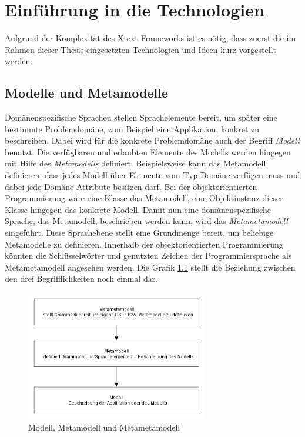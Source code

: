 \documentclass[a4paper,12pt]{scrreprt}
\begin{document}
\chapter{Einführung in die Technologien}
\label{ch:technologien}
Aufgrund der Komplexität des Xtext-Frameworks ist es nötig, dass zuerst die im Rahmen dieser Thesis eingesetzten Technologien und Ideen kurz vorgestellt werden.
\section{Modelle und  Metamodelle}
Domänenspezifische Sprachen stellen Sprachelemente bereit, um später eine be\-stimm\-te Problemdomäne, zum Beispiel eine Applikation, konkret zu beschreiben.
Dabei wird für die konkrete Problemdomäne auch der Begriff \textit{Modell} benutzt.
Die verfügbaren und erlaubten Elemente des Modells werden hingegen mit Hilfe des \textit{Metamodells} definiert. Beispielsweise kann das Metamodell definieren, dass jedes Modell über Elemente vom Typ Domäne verfügen muss und dabei jede Domäne Attribute besitzen darf. Bei der objektorientierten Programmierung wäre eine Klasse das  Metamodell, eine Objektinstanz dieser Klasse hingegen das konkrete Modell.
Damit nun eine domänenspezifische Sprache, das  Metamodell, beschrieben werden kann, wird das \textit{Metametamodell} eingeführt. Diese Sprachebene stellt eine Grundmenge bereit, um beliebige Metamodelle zu definieren. Innerhalb der objektorientierten Programmierung könnten die Schlüsselwörter und genutzten Zeichen der Programmiersprache als Metametamodell angesehen werden.
Die Grafik \ref{fig:meta-meta-modell} stellt die Beziehung zwischen den drei Begrifflichkeiten noch einmal dar.

\begin{figure}[h]
	\centering
		\includegraphics[width=300px]{diagramme/meta-meta-modell.png}
		\caption{Modell,  Metamodell und Metametamodell}
		\label{fig:meta-meta-modell}
\end{figure}
\end{document}
